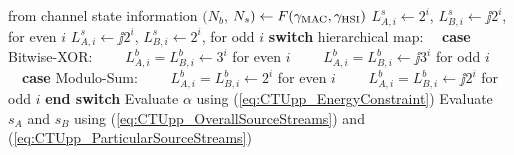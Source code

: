   \begin{algorithmic}[1]
    \State {} from channel state
    information
    \State $(N_b$, $N_s) \gets F(\gamma_{\rm MAC},\gamma_{\rm HSI})$     
      
      \State  $L_{A,i}^s \gets 2^i$,  $L_{B,i}^s\gets \jj 2^i$, for even $i$
      \label{alg_line:CTUpp_LAAssignment}
      \State  $L_{A,i}^s \gets \jj 2^i$,  $L_{B,i}^s\gets 2^i$, for odd $i$
      \label{alg_line:CTUpp_LBAssignment}
    \EndFor
      
    \State \textbf{switch} hierarchical map:
    \State ~~\textbf{case} Bitwise-XOR: 
    \State ~~~~$L_{A,i}^b=L_{B,i}^b \gets 3^i $ for even $i$     
    \label{alg_line:CTUpp_LAXORAssignment}
    \State ~~~~$L_{A,i}^b=L_{B,i}^b \gets \jj 3^i$ for odd $i$ 
    \label{alg_line:CTUpp_LBXORAssignment}
    \State ~~\textbf{case} Modulo-Sum:
    \State ~~~~$L_{A,i}^b=L_{B,i}^b \gets 2^i $ for even $i$ 
    \label{alg_line:CTUpp_LAMSAssignment}
    \State ~~~~$L_{A,i}^b=L_{B,i}^b \gets \jj 2^i $ for odd $i$ 
    \label{alg_line:CTUpp_LBMSAssignment}
    \State \textbf{end switch}
    \EndFor
    \State Evaluate $\alpha$ using (\ref{eq:CTUpp_EnergyConstraint}) 
    \State Evaluate $s_A$ and $s_B$ using 
    (\ref{eq:CTUpp_OverallSourceStreams})     and    (\ref{eq:CTUpp_ParticularSourceStreams})
    \State {}
  \end{algorithmic}
